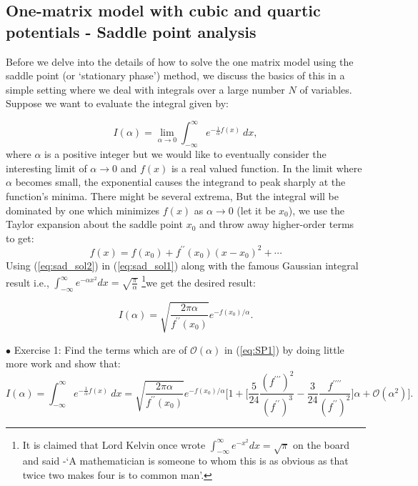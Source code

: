\documentclass[11pt]{article}
\begin{document}
\subsection{One-matrix model with cubic and quartic potentials - Saddle point analysis}
Before we delve into the details of how to solve the one matrix model using the 
saddle point (or `stationary phase') method, we discuss the basics of this in a simple setting where we deal with integrals over a large number $N$ of variables. Suppose we want to evaluate the integral given by:

\begin{equation}
\label{eq:SP1} 
I(\alpha) = \lim_{\alpha \to 0} \int_{-\infty}^{\infty} e^{-\frac{1}{\alpha}f(x)} ~dx, 
\end{equation}
where $\alpha$ is a positive integer but we would like to eventually consider the interesting limit 
of $\alpha \to 0$ and $f(x)$ is a real valued function. In the limit where $\alpha$ becomes small, 
the exponential causes the integrand to peak sharply at the function's minima. There might be several extrema,
But the integral will be dominated by one which minimizes $f(x)$ as $\alpha \to 0$ (let it be $x_{0}$), 
we use the Taylor expansion about the saddle point $x_{0}$ and throw away higher-order terms to get:
\begin{equation}
	\label{eq:sad_sol2}
	f(x) = f(x_{0}) + f^{\prime\prime}(x_{0}) (x-x_0)^{2} + \cdots 
\end{equation}
Using (\ref{eq:sad_sol2}) in (\ref{eq:sad_sol1}) along with the famous Gaussian integral result 
i.e., $\int_{-\infty}^{\infty} e^{-\alpha x^2} dx = \sqrt{\frac{\pi}{\alpha}}$
\footnote{It is claimed that Lord Kelvin once wrote $\int_{-\infty}^{\infty}e^{-x^2} dx = \sqrt{\pi}$ on the board 
and said -`A mathematician is someone to whom this is as obvious as that 
twice two makes four is to common man'.}we get the desired result:

\begin{equation}
	\label{eq:sad_sol1} 
	I(\alpha) =  \sqrt{\frac{2\pi \alpha}{f^{\prime\prime}(x_{0})}} e^{-f(x_{0})/\alpha}. 
\end{equation}



\begin{mdframed}[backgroundcolor=blue!3] 
	\textsc{} 
	$\bullet$ Exercise 1: Find the terms which are of $\mathcal{O}(\alpha)$ in (\ref{eq:SP1}) by doing little more work and show that:
	\begin{equation*}
	I(\alpha) = \int_{-\infty}^{\infty} e^{-\frac{1}{\alpha}f(x)} ~dx = \sqrt{\frac{2\pi \alpha}{f^{\prime\prime}(x_{0})}} e^{-f(x_{0})/\alpha} \Bigg[1 + 
	\Big[ \frac{5}{24} \frac{(f^{\prime\prime\prime})^2}{(f^{\prime\prime})^3} - \frac{3}{24} \frac{f^{\prime\prime\prime\prime}}{(f^{\prime\prime})^2}\Big] \alpha + \mathcal{O}(\alpha^{2})\Bigg]. 
	\end{equation*}	
\end{mdframed} 
\end{document}
